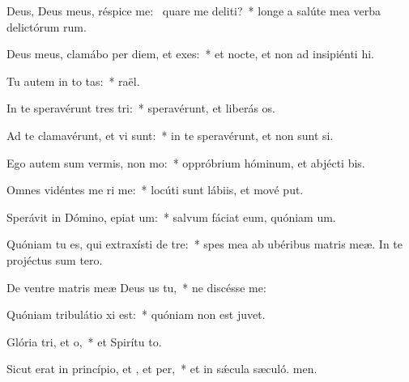 \item Deus, Deus meus, réspice  me:~\pscross{} quare me deliti?~* longe a salúte mea verba delictórum rum.
\item Deus meus, clamábo per diem, et  exes:~* et nocte, et non ad insipiénti hi.
\item Tu autem in to tas:~*  raël.
\item In te speravérunt tres tri:~* speravérunt, et liberás os.
\item Ad te clamavérunt, et vi  sunt:~* in te speravérunt, et non sunt si.
\item Ego autem sum vermis,  non mo:~* oppróbrium hóminum, et abjécti bis.
\item Omnes vidéntes me ri me:~* locúti sunt lábiis, et mové put.
\item Sperávit in Dómino, epiat um:~* salvum fáciat eum, quóniam  um.
\item Quóniam tu es, qui extraxísti  de tre:~* spes mea ab ubéribus matris meæ. In te projéctus sum  tero.
\item De ventre matris meæ Deus us  tu,~* ne discésse  me:
\item Quóniam tribulátio xi est:~* quóniam non est  juvet.
\item Glória tri, et o,~* et Spirítu to.
\item Sicut erat in princípio, et , et per,~* et in sǽcula sæculó. men.

